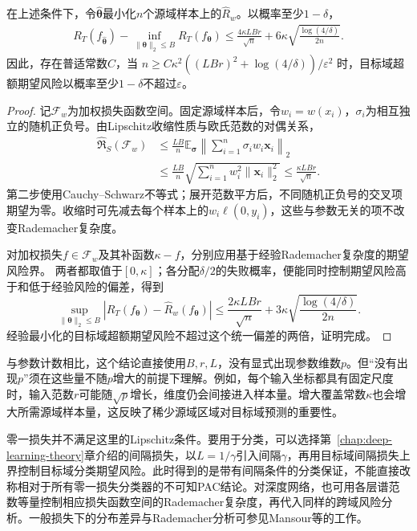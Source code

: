 \begin{theorem}[范数受限线性预测的迁移保证]
\label{thm:transfer-linear-norm}
在上述条件下，令$\widehat{\bm\theta}$最小化$n$个源域样本上的$\hat R_w$。以概率至少$1-\delta$，
\begin{equation}
 \begin{aligned}
 R_T(f_{\widehat{\bm\theta}})
 -\inf_{\|\bm\theta\|_2\leq B}R_T(f_{\bm\theta})
 \leq\frac{4\kappa LBr}{\sqrt n}
       +6\kappa\sqrt{\frac{\log(4/\delta)}{2n}}.
 \end{aligned}
 \label{eq:transfer-norm-excess}
\end{equation}
因此，存在普适常数$C$，当
$n\geq C\kappa^2((LBr)^2+\log(4/\delta))/\varepsilon^2$
时，目标域超额期望风险以概率至少$1-\delta$不超过$\varepsilon$。
\end{theorem}
\begin{proof}
记$\mathcal F_w$为加权损失函数空间。固定源域样本后，令$w_i=w(x_i)$，$\sigma_i$为相互独立的随机正负号。由Lipschitz收缩性质与欧氏范数的对偶关系，
\begin{align*}
 \widehat{\mathfrak R}_S(\mathcal F_w)
 &\leq\frac{LB}{n}\mathbb E_{\bm\sigma}
       \left\|\sum_{i=1}^n\sigma_iw_i\bm x_i\right\|_2\\
 &\leq\frac{LB}{n}\sqrt{\sum_{i=1}^n w_i^2\|\bm x_i\|_2^2}
 \leq\frac{\kappa LBr}{\sqrt n}.
\end{align*}
第二步使用Cauchy--Schwarz不等式；展开范数平方后，不同随机正负号的交叉项期望为零。收缩时可先减去每个样本上的$w_i\ell(0,y_i)$，这些与参数无关的项不改变Rademacher复杂度。

对加权损失$f\in\mathcal F_w$及其补函数$\kappa-f$，分别应用基于经验Rademacher复杂度的期望风险界。
两者都取值于$[0,\kappa]$；各分配$\delta/2$的失败概率，便能同时控制期望风险高于和低于经验风险的偏差，得到
\[
 \sup_{\|\bm\theta\|_2\leq B}
 |R_T(f_{\bm\theta})-\hat R_w(f_{\bm\theta})|
 \leq\frac{2\kappa LBr}{\sqrt n}
       +3\kappa\sqrt{\frac{\log(4/\delta)}{2n}}.
\]
经验最小化的目标域超额期望风险不超过这个统一偏差的两倍，证明完成。
\end{proof}

与参数计数相比，这个结论直接使用$B,r,L$，没有显式出现参数维数$p$。但“没有出现$p$”须在这些量不随$p$增大的前提下理解。例如，每个输入坐标都具有固定尺度时，输入范数$r$可能随$\sqrt p$增长，维度仍会间接进入样本量。增大覆盖常数$\kappa$也会增大所需源域样本量，这反映了稀少源域区域对目标域预测的重要性。

零一损失并不满足这里的Lipschitz条件。要用于分类，可以选择第~\ref{chap:deep-learning-theory}章介绍的间隔损失，以$L=1/\gamma$引入间隔$\gamma$，再用目标域间隔损失上界控制目标域分类期望风险。此时得到的是带有间隔条件的分类保证，不能直接改称相对于所有零一损失分类器的不可知PAC结论。对深度网络，也可用各层谱范数等量控制相应损失函数空间的Rademacher复杂度，再代入同样的跨域风险分析。一般损失下的分布差异与Rademacher分析可参见Mansour等的工作。

